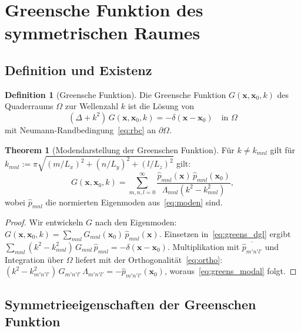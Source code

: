 ﻿\documentclass[12pt, a4paper]{article}
\theoremstyle{definition}
\newtheorem{definition}{Definition}[section]
\newtheorem{theorem}{Theorem}[section]
\theoremstyle{remark}
\newcommand{\Lx}{L_x}
\newcommand{\Ly}{L_y}
\newcommand{\Lz}{L_z}
\begin{document}
\section{Greensche Funktion des symmetrischen Raumes}
\label{sec:greens}

\subsection{Definition und Existenz}

\begin{definition}[Greensche Funktion]
Die Greensche Funktion $G(\mathbf{x}, \mathbf{x}_0, k)$ des Quaderraums
$\Omega$ zur Wellenzahl $k$ ist die Lösung von
\begin{equation}
  (\Delta + k^2)\,G(\mathbf{x},\mathbf{x}_0,k) = -\delta(\mathbf{x}-\mathbf{x}_0)
  \quad \text{in } \Omega
  \label{eq:greens_dgl}
\end{equation}
mit Neumann-Randbedingung~\eqref{eq:rbc} an $\partial\Omega$.
\end{definition}

\begin{theorem}[Modendarstellung der Greenschen Funktion]
\label{thm:greens_modal}
Für $k \neq k_{mnl}$ gilt für $k_{mnl} := \pi\sqrt{(m/\Lx)^2 + (n/\Ly)^2 + (l/\Lz)^2}$ gilt:
\begin{equation}
  G(\mathbf{x},\mathbf{x}_0,k) = \sum_{m,n,l=0}^{\infty}
  \frac{\hat{p}_{mnl}(\mathbf{x})\,\hat{p}_{mnl}(\mathbf{x}_0)}
       {\Lambda_{mnl}(k^2 - k_{mnl}^2)},
  \label{eq:greens_modal}
\end{equation}
wobei $\hat{p}_{mnl}$ die normierten Eigenmoden aus~\eqref{eq:moden} sind.
\end{theorem}

\begin{proof}
Wir entwickeln $G$ nach den Eigenmoden:
$G(\mathbf{x},\mathbf{x}_0,k) = \sum_{mnl} G_{mnl}(\mathbf{x}_0)\,\hat{p}_{mnl}(\mathbf{x}).$
Einsetzen in~\eqref{eq:greens_dgl} ergibt
$\sum_{mnl}(k^2 - k_{mnl}^2)\,G_{mnl}\,\hat{p}_{mnl} = -\delta(\mathbf{x}-\mathbf{x}_0)$.
Multiplikation mit $\overline{\hat{p}_{m'n'l'}}$ und Integration über $\Omega$ liefert
mit der Orthogonalität~\eqref{eq:ortho}:
$(k^2 - k_{m'n'l'}^2)\,G_{m'n'l'}\,\Lambda_{m'n'l'} = -\hat{p}_{m'n'l'}(\mathbf{x}_0)$,
woraus~\eqref{eq:greens_modal} folgt. 
\end{proof}

\subsection{Symmetrieeigenschaften der Greenschen Funktion}
\end{document}
